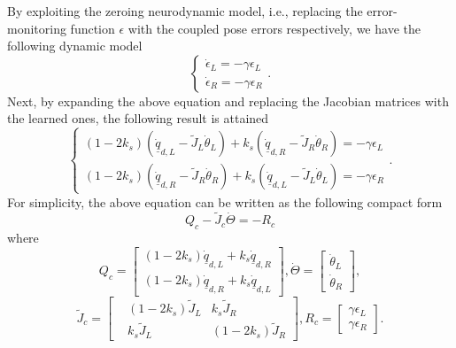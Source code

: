 \documentclass[journal,twoside,web]{ieeecolor}
\begin{document}
By exploiting the zeroing neurodynamic model, i.e., replacing the error-monitoring function $\epsilon$ with the coupled pose errors respectively, we have the following dynamic model
\begin{equation}\label{eq:dynamic model}
\left\{\begin{aligned}
\dot{\epsilon}_L = - \gamma \epsilon_L \\
\dot{\epsilon}_R = - \gamma \epsilon_R
\end{aligned}\right..
\end{equation}
Next, by expanding the above equation and replacing the Jacobian matrices with the learned ones, the following result is attained
\begin{equation}
\left\{\begin{aligned}
(1-2k_s)\left(\dot{\underline{q}}_{d,L} - \tilde{J}_L \dot{\theta}_L\right) +
k_s \left( \dot{\underline{q}}_{d,R} - \tilde{J}_R \dot{\theta}_R \right)
= -\gamma \epsilon_L \\
(1-2k_s)\left(\dot{\underline{q}}_{d,R} - \tilde{J}_R \dot{\theta}_R\right) +
k_s \left( \dot{\underline{q}}_{d,L} - \tilde{J}_L \dot{\theta}_L \right)
= -\gamma \epsilon_R 
\end{aligned}\right..
\end{equation}
For simplicity, the above equation can be written as the following compact form
\begin{equation}
Q_c - \tilde J_c \dot{\Theta} = -R_c
\label{eq:equality}
\end{equation}
where
\begin{equation}
Q_c = \left[\begin{matrix}
(1-2k_s)\dot{\underline{q}}_{d,L} + k_s \dot{\underline{q}}_{d,R} \\
(1-2k_s)\dot{\underline{q}}_{d,R} + k_s \dot{\underline{q}}_{d,L}
\end{matrix}\right],
\dot{\Theta} = \left[\begin{matrix}
\dot{\theta}_L \\
\dot{\theta}_R
\end{matrix}\right],
\end{equation}
\begin{equation}
\tilde J_c = \left[\begin{matrix}
&(1-2k_s) \tilde J_L & k_s \tilde J_R\\
& k_s \tilde J_L & (1-2k_s) \tilde J_R
\end{matrix}\right], 
R_c = \left[\begin{matrix}
\gamma \epsilon_L\\
\gamma \epsilon_R
\end{matrix}\right].
\end{equation}
\end{document}

